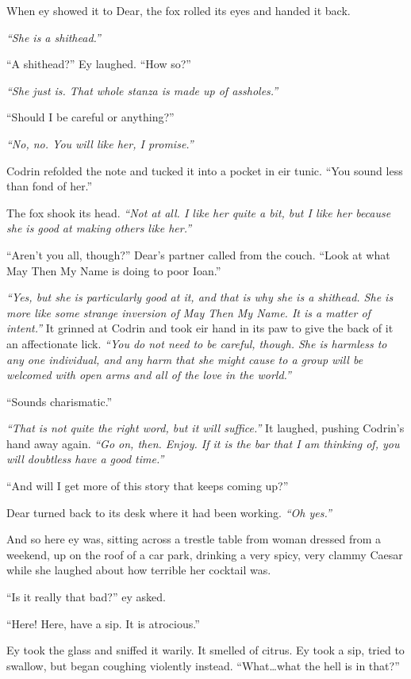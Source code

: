 When ey showed it to Dear, the fox rolled its eyes and handed it back.

\emph{``She is a shithead.''}

``A shithead?'' Ey laughed. ``How so?''

\emph{``She just is. That whole stanza is made up of assholes.''}

``Should I be careful or anything?''

\emph{``No, no. You will like her, I promise.''}

Codrin refolded the note and tucked it into a pocket in eir tunic. ``You sound less than fond of her.''

The fox shook its head. \emph{``Not at all. I like her quite a bit, but I like her because she is good at making others like her.''}

``Aren't you all, though?'' Dear's partner called from the couch. ``Look at what May Then My Name is doing to poor Ioan.''

\emph{``Yes, but she is particularly good at it, and that is why she is a shithead. She is more like some strange inversion of May Then My Name. It is a matter of intent.''} It grinned at Codrin and took eir hand in its paw to give the back of it an affectionate lick. \emph{``You do not need to be careful, though. She is harmless to any one individual, and any harm that she might cause to a group will be welcomed with open arms and all of the love in the world.''}

``Sounds charismatic.''

\emph{``That is not quite the right word, but it will suffice.''} It laughed, pushing Codrin's hand away again. \emph{``Go on, then. Enjoy. If it is the bar that I am thinking of, you will doubtless have a good time.''}

``And will I get more of this story that keeps coming up?''

Dear turned back to its desk where it had been working. \emph{``Oh yes.''}

And so here ey was, sitting across a trestle table from woman dressed from a weekend, up on the roof of a car park, drinking a very spicy, very clammy Caesar while she laughed about how terrible her cocktail was.

``Is it really that bad?'' ey asked.

``Here! Here, have a sip. It is atrocious.''

Ey took the glass and sniffed it warily. It smelled of citrus. Ey took a sip, tried to swallow, but began coughing violently instead. ``What\ldots what the hell is in that?''

